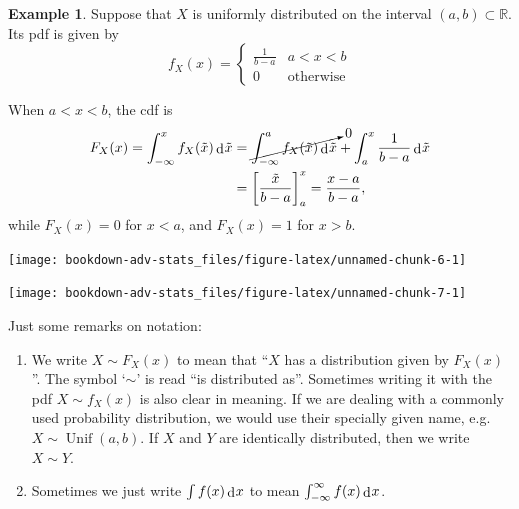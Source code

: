 \documentclass[
]{book}
\DeclareMathOperator{\Unif}{Unif}
\newcommand{\bbR}{\mathbb{R}}
\DeclareMathOperator{\dd}{d}
\newcommand{\dint}{\dd\hspace{0.5pt}\!}
\theoremstyle{definition}
\theoremstyle{definition}
\newtheorem{example}{Example}[chapter]
\theoremstyle{definition}
\theoremstyle{definition}
\theoremstyle{remark}
\begin{document}
\begin{example}

Suppose that \(X\) is uniformly distributed on the interval \((a,b) \subset \bbR\).
Its pdf is given by
\[
f_X(x) = \begin{cases}
\frac{1}{b-a} & a < x < b \\
0 & \text{otherwise}
\end{cases}
\]

When \(a < x < b\), the cdf is
\begin{align*}
F_X(x) 
= \int_{-\infty}^x f_X(\tilde x) \dint \tilde x 
&=\cancelto{0}{\int_{-\infty}^a f_X(\tilde x) \dint \tilde x}  + \int_{a}^x \frac{1}{b-a} \dint \tilde x \\
&= \left[ \frac{\tilde x}{b-a} \right]_a^x = \frac{x-a}{b-a},
\end{align*}
while \(F_X(x) = 0\) for \(x<a\), and \(F_X(x)=1\) for \(x>b\).

\begin{center}\texttt{[image: bookdown-adv-stats\_files/figure-latex/unnamed-chunk-6-1]} \end{center}

\begin{center}\texttt{[image: bookdown-adv-stats\_files/figure-latex/unnamed-chunk-7-1]} \end{center}

\end{example}

Just some remarks on notation:

\begin{enumerate}
\def\labelenumi{\arabic{enumi}.}
\item
  We write \(X \sim F_X(x)\) to mean that ``\(X\) has a distribution given by \(F_X(x)\)''.
  The symbol `\(\sim\)' is read ``is distributed as''.
  Sometimes writing it with the pdf \(X \sim f_X(x)\) is also clear in meaning.
  If we are dealing with a commonly used probability distribution, we would use their specially given name, e.g.~\(X\sim \Unif(a,b)\).
  If \(X\) and \(Y\) are identically distributed, then we write \(X\sim Y\).
\item
  Sometimes we just write \(\int f(x) \dint x\) to mean \(\int_{-\infty}^{\infty} f(x) \dint x\).
\end{enumerate}
\end{document}
